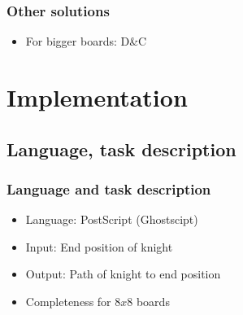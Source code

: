 \documentclass{beamer}
\begin{document}
\begin{frame}
\frametitle{Other solutions}
\begin{itemize}
	\item For bigger boards: D\&C
\end{itemize}
\end{frame}

\section{Implementation}
\subsection{Language, task description}
\begin{frame}
\frametitle{Language and task description}
\begin{itemize}
	\item Language: PostScript (Ghostscipt)
	\item Input: End position of knight
	\item Output: Path of knight to end position
	\item Completeness for $8 x 8$ boards
\end{itemize}
\end{frame}
\end{document}
